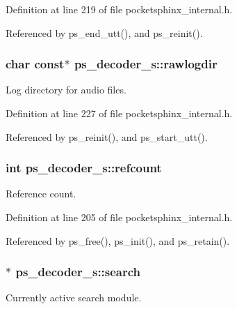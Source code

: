 Definition at line 219 of file pocketsphinx\-\_\-internal.\-h.



Referenced by ps\-\_\-end\-\_\-utt(), and ps\-\_\-reinit().

\subsubsection[{rawlogdir}]{\setlength{\rightskip}{0pt plus 5cm}char const$\ast$ ps\-\_\-decoder\-\_\-s\-::rawlogdir}\label{structps__decoder__s_aa2610c52a9267ee18ca095169bf34bfd}


Log directory for audio files. 



Definition at line 227 of file pocketsphinx\-\_\-internal.\-h.



Referenced by ps\-\_\-reinit(), and ps\-\_\-start\-\_\-utt().

\subsubsection[{refcount}]{\setlength{\rightskip}{0pt plus 5cm}int ps\-\_\-decoder\-\_\-s\-::refcount}\label{structps__decoder__s_aa5ab90180288b6c9039eb86b496f76aa}


Reference count. 



Definition at line 205 of file pocketsphinx\-\_\-internal.\-h.



Referenced by ps\-\_\-free(), ps\-\_\-init(), and ps\-\_\-retain().

\subsubsection[{search}]{$\ast$ ps\-\_\-decoder\-\_\-s\-::search}\label{structps__decoder__s_ad337270efc93613cf8dd7594f6515799}


Currently active search module. 



